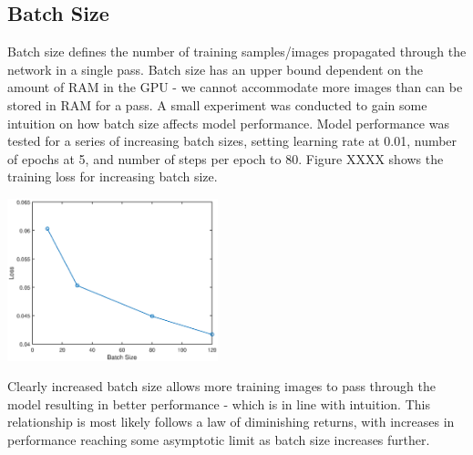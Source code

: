 \documentclass[a4paper]{article}
\begin{document}
\subsection{Batch Size}
\begin{minipage}{0.45\textwidth}
Batch size defines the number of training samples/images propagated through the network in a single pass. Batch size has an upper bound dependent on the amount of RAM in the GPU - we cannot accommodate more images than can be stored in RAM for a pass. A small experiment was conducted to gain some intuition on how batch size affects model performance. Model performance was tested for a series of increasing batch sizes, setting learning rate at 0.01, number of epochs at 5, and number of steps per epoch to 80. Figure XXXX shows the training loss for increasing batch size.
\end{minipage}
\hspace{1cm}
\begin{minipage}{0.45\textwidth}
\centering
\includegraphics[height=4.7cm]{hyp_par_1}
\end{minipage}

\vspace{0.3cm}

Clearly increased batch size allows more training images to pass through the model resulting in better performance - which is in line with intuition. This relationship is most likely follows a law of diminishing returns, with increases in performance reaching some asymptotic limit as batch size increases further.
\end{document}
